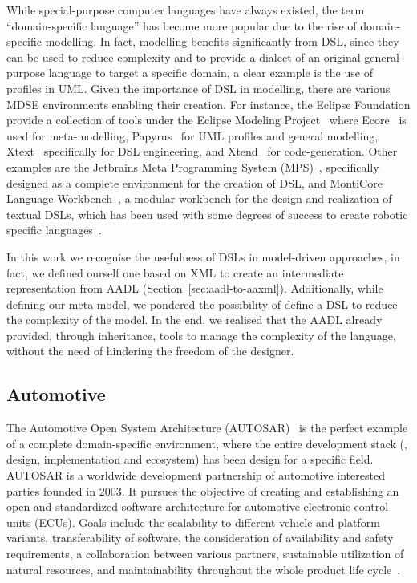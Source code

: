 While special-purpose computer languages have always existed, the term ``domain-specific language'' has become more popular due to the rise of domain-specific modelling. In fact, modelling benefits significantly from DSL, since they can be used to reduce complexity and to provide a dialect of an original general-purpose language to target a specific domain, a clear example is the use of profiles in UML. Given the importance of DSL in modelling, there are various MDSE environments enabling their creation. For instance, the Eclipse Foundation provide a collection of tools under the Eclipse Modeling Project~\cite{gronback2009eclipse} where Ecore~\cite{steinberg2008emf, sciamma2013ecore} is used for meta-modelling, Papyrus~\cite{lanusse2009papyrus} for UML profiles and general modelling, Xtext~\cite{eysholdt2010xtext} specifically for DSL engineering, and Xtend~\cite{bettini2016implementing} for code-generation. Other examples are the Jetbrains Meta Programming System (MPS)~\cite{mps}, specifically designed as a complete environment for the creation of DSL, and MontiCore Language Workbench~\cite{krahn2010monticore}, a modular workbench for the design and realization of textual DSLs, which has been used with some degrees of success to create robotic specific languages~\cite{thomas2013new}.

In this work we recognise the usefulness of DSLs in model-driven approaches, in fact, we defined ourself one based on XML to create an intermediate representation from AADL (Section~\ref{sec:aadl-to-aaxml}). Additionally, while defining our meta-model, we pondered the possibility of define a DSL to reduce the complexity of the model. In the end, we realised that the AADL already provided, through inheritance, tools to manage the complexity of the language, without the need of  hindering the freedom of the designer.

\subsection{Automotive}
The Automotive Open System Architecture (AUTOSAR)~\cite{furst2009autosar} is the perfect example of a complete domain-specific environment, where the entire development stack (\ie, design, implementation and ecosystem) has been design for a specific field. AUTOSAR is a worldwide development partnership of automotive interested parties founded in 2003. It pursues the objective of creating and establishing an open and standardized software architecture for automotive electronic control units (ECUs). Goals include the scalability to different vehicle and platform variants, transferability of software, the consideration of availability and safety requirements, a collaboration between various partners, sustainable utilization of natural resources, and maintainability throughout the whole product life cycle~\cite{autosar}.


